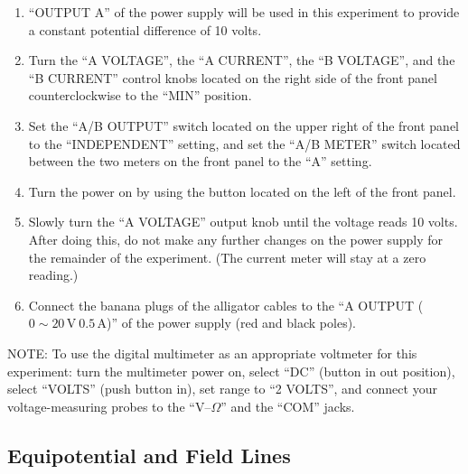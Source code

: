 \begin{enumerate}
    \item ``OUTPUT A'' of the power supply will be used in this experiment to provide a constant potential difference of 10 volts.
    \item Turn the ``A VOLTAGE'', the ``A CURRENT'', the ``B VOLTAGE'', and the ``B CURRENT'' control knobs located on the right side of the front panel counterclockwise to the ``MIN'' position.
    \item Set the ``A/B OUTPUT'' switch located on the upper right of the front panel to the ``INDEPENDENT'' setting, and set the ``A/B METER'' switch located between the two meters on the front panel to the ``A'' setting.
    \item Turn the power on by using the button located on the left of the front panel.
    \item Slowly turn the ``A VOLTAGE'' output knob until the voltage reads 10 volts. After doing this, do not make any further changes on the power supply for the remainder of the experiment. (The current meter will stay at a zero reading.)
    \item Connect the banana plugs of the alligator cables to the ``A OUTPUT ($0\sim 20\,\mathrm{V}\  0.5\,\mathrm{A}$)'' of the power supply (red and black poles).
\end{enumerate}

NOTE: To use the digital multimeter as an appropriate voltmeter for this experiment: turn the multimeter power on, select ``DC'' (button in out position), select ``VOLTS'' (push button in), set range to ``2 VOLTS'', and connect your voltage-measuring probes to the ``$\mathrm{V}$--$\Omega$'' and the ``COM'' jacks.

\subsection{Equipotential and Field Lines}


